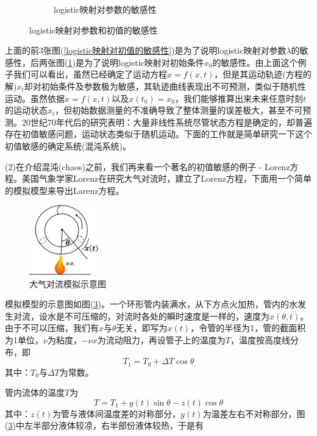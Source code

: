 \begin{figure}[H]
\begin{subfigure}[b]{0.4\textwidth}
	            \caption{logistic映射对参数的敏感性}
	            \label{logistic映射对参数的敏感性}
	        \end{subfigure}
	        \caption{logistic映射对参数和初值的敏感性}
	        \label{logistic映射对参数和初值的敏感性}
	    \end{figure}
        \par
        上面的前3张图(\ref{logistic映射对初值的敏感性})是为了说明logistic映射对参数$\lambda$的敏感性，后两张图(\ref{logistic映射对参数的敏感性})是为了说明logistic映射对初始条件$x_0$的敏感性。由上面这个例子我们可以看出，虽然已经确定了运动方程$\dot{x}=f(x,t)$，但是其运动轨迹(方程的解)$x_t$却对初始条件及参数极为敏感，其轨迹曲线表现出不可预测，类似于随机性运动。虽然依据$\dot{x}=f(x,t)$以及$x(t_0)=x_0$，我们能够推算出来未来任意时刻$t$的运动状态$x_t$，但初始数据测量的不准确导致了整体测量的误差极大，甚至不可预测。20世纪70年代后的研究表明：大量非线性系统尽管状态方程是确定的，却普遍存在初值敏感问题，运动状态类似于随机运动。下面的工作就是简单研究一下这个初值敏感的确定系统(混沌系统)。
        \par
        (2)在介绍混沌(chaos)之前，我们再来看一个著名的初值敏感的例子 - Lorenz方程。美国气象学家Lorenz在研究大气对流时，建立了Lorenz方程，下面用一个简单的模拟模型来导出Larenz方程。
         \begin{figure}[H]
        \centering
        \includegraphics[width=3cm]{images/Atmospher_convection_simulation.jpg}
        \caption{大气对流模拟示意图}
        \label{fig:大气对流模拟示意图}
        \end{figure}
        \par
        模拟模型的示意图如图(\ref{fig:大气对流模拟示意图})。一个环形管内装满水，从下方点火加热，管内的水发生对流，设水是不可压缩的，对流时各处的瞬时速度是一样的，速度为$x(\theta ,t)$。由于不可以压缩，我们有$x$与$\theta $无关，即写为$x(t)$，令管的半径为1，管的截面积为1单位，$\nu $为粘度，$- \nu x$为流动阻力，再设管子上的温度为$T$，温度按高度线分布，即
        \[
            T_1=T_0+\Delta T \cos \theta
        \]
        其中：$T_0$与$\Delta T$为常数。
        \par
        管内流体的温度$T$为
        \[
            T = T_1+y(t)\sin \theta -z(t)\cos \theta
        \]
        其中：$z(t)$为管与液体间温度差的对称部分，$y(t)$为温差左右不对称部分，图(\ref{fig:大气对流模拟示意图})中左半部分液体较凉，右半部份液体较热，于是有
